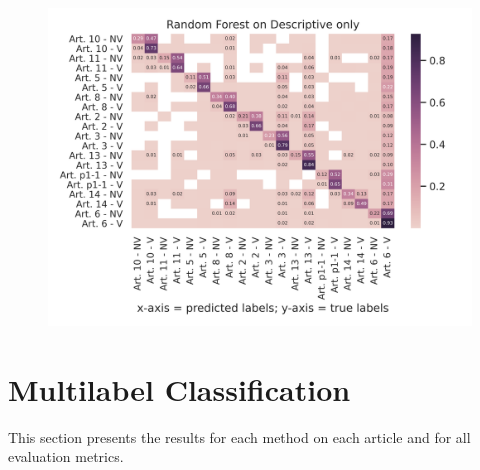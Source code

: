 \documentclass{article}
\begin{document}
\begin{figure}[!htb]
    \centering
    \includegraphics[scale=0.7]{data/analysis/cm/multiclass_cm_test_random_forest_descriptive_only.png}  
\end{figure}

\newpage
\section{Multilabel Classification}

This section presents the results for each method on each article and for all evaluation metrics.\\

\noindent
	~\\
	~\\
	~\\
	~\\
	~\\
	~\\
	~\\
\end{document}

